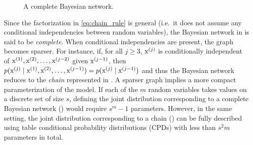 \begin{figure}
    \centering
    \caption{A complete Bayesian network.}
    \label{fig:complete_bayesian_net}
\end{figure}

Since the factorization in \eqref{eq:chain_rule} is general (i.e.\ it does not assume any conditional independencies between random variables), the Bayesian network in  is said to be \emph{complete}. When conditional independencies are present, the graph becomes sparser. For instance, if, for all $j \geq 3$, ${\textnormal{x}}^{(j)}$ is conditionally independent of ${\textnormal{x}}^{(1)}, {\textnormal{x}}^{(2)}, \dots, {\textnormal{x}}^{(j-2)}$ given ${\textnormal{x}}^{(j-1)}$, then $p({\textnormal{x}}^{(j)} \mid {\textnormal{x}}^{(1)}, {\textnormal{x}}^{(2)}, \dots, {\textnormal{x}}^{(j-1)}) = p({\textnormal{x}}^{(j)} \mid {\textnormal{x}}^{(j-1)})$ and thus the Bayesian network reduces to the \emph{chain} represented in . A sparser graph implies a more compact parameterization of the model. If each of the $m$ random variables takes values on a discrete set of size $s$, defining the joint distribution corresponding to a complete Bayesian network () would require $s^{m}-1$ parameters. However, in the same setting, the joint distribution corresponding to a chain () can be fully described using table conditional probability distributions (CPDs) with less than $s^2m$ parameters in total.

